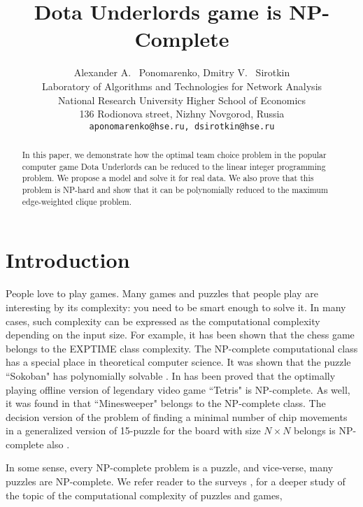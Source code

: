 \documentclass[smallextended]{svjour3}       %
\title{Dota Underlords game is NP-Complete}
\author{
  Alexander A. ~Ponomarenko, Dmitry V. ~Sirotkin \\
  Laboratory of Algorithms and Technologies for Network Analysis\\
  National Research University Higher School of Economics \\
  136 Rodionova street, Nizhny Novgorod, Russia\\
  \texttt{aponomarenko@hse.ru, dsirotkin@hse.ru} \\
}
\begin{document}
\maketitle

\begin{abstract}
In this paper, we demonstrate how the optimal team choice problem in the popular computer game Dota Underlords can be reduced to the linear integer programming problem. We propose a model and solve it for real data. We also prove that this problem is NP-hard and show that it can be polynomially reduced to the maximum edge-weighted clique problem.

\end{abstract}





\section{Introduction}
People love to play games. Many games and puzzles that people play are interesting by its complexity: you need to be smart enough to solve it. In many cases, such complexity can be expressed as the computational complexity depending on the input size. For example, it has been shown \cite{fraenkel1981computing} that the chess game belongs to the EXPTIME class complexity.
The NP-complete computational class has a special place in theoretical computer science.
It was shown that the puzzle ``Sokoban"  has polynomially solvable \cite{hearn2005pspace}.
In \cite{breukelaar2004tetris} has been proved that the optimally playing offline	 version of legendary video game ``Tetris" is NP-complete. As well, it was found in \cite{kaye2000minesweeper} that ``Minesweeper" belongs to the NP-complete class. The decision version of the problem of finding a minimal number of chip movements in a generalized version of 15-puzzle for the board with size $N \times N$ belongs is NP-complete also \cite{ratner1986finding}.

In some sense, every NP-complete problem is a puzzle, and vice-verse, many puzzles are NP-complete. We refer reader to the surveys \cite{costa2018computational}, \cite{kendall2008survey} for a deeper study of the topic of the computational complexity of puzzles and games, 
\end{document}
